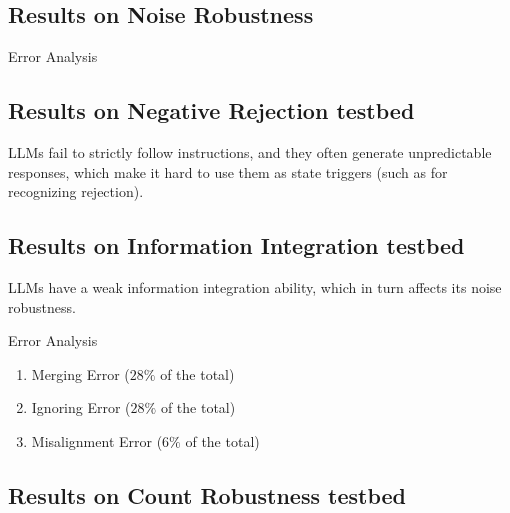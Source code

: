 \documentclass{beamer}
\begin{document}
\subsection{Results on Noise Robustness}

\begin{frame}
    
\end{frame}

\begin{frame}{Error Analysis}
    
\end{frame}

\subsection{Results on Negative Rejection testbed}

\begin{frame}
    
    LLMs fail to strictly follow instructions, and they often generate unpredictable responses, which make it hard to use them as state triggers (such as for recognizing rejection).
\end{frame}

\begin{frame}
    
\end{frame}

\subsection{Results on Information Integration testbed}

\begin{frame}
    
    LLMs have a weak information integration ability, which in turn affects its noise robustness.
\end{frame}

\begin{frame}{{Error Analysis}}
    
    \begin{enumerate}
        \item {Merging Error ($28\%$ of the total)}
        \item {Ignoring Error ($28\%$ of the total)}
        \item {Misalignment Error ($6\%$ of the total)}
    \end{enumerate}
\end{frame}

\subsection{Results on Count Robustness testbed}
\end{document}
